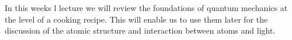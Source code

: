 In this weeks l lecture we will review the foundations of quantum mechanics at the level of a cooking recipe. This will enable us to use them later for the discussion of the atomic structure and interaction between atoms and light.